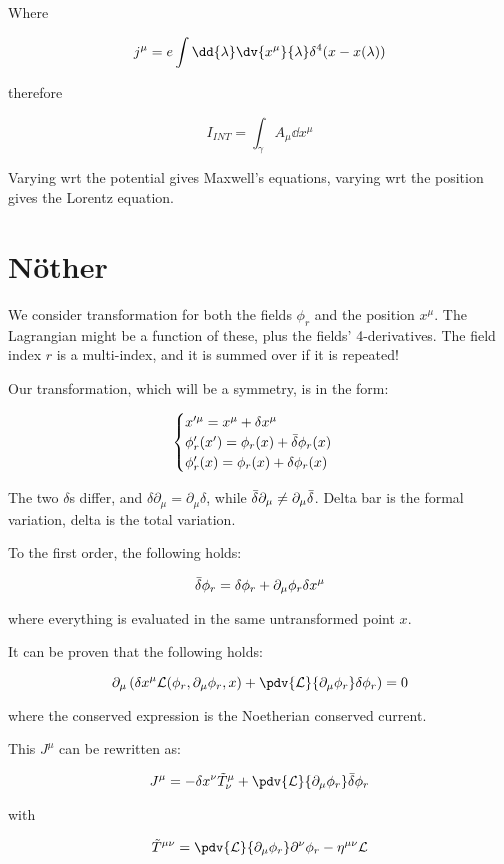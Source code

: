 Where

\[
j^\mu = e \int \dd{\lambda} \dv{x^\mu}{\lambda} \delta^4 (x - x(\lambda)) 
\]

therefore 

\[
I_{INT} = \int _\gamma A_\mu \dd{x^\mu}
\]

Varying wrt the potential gives Maxwell's equations, varying wrt the position gives the Lorentz equation.

\section{Nöther}

We consider transformation for both the fields $\phi_r$ and the position $x^\mu$.
The Lagrangian might be a function of these, plus the fields' 4-derivatives.
The field index $r$ is a multi-index, and it is summed over if it is repeated!

Our transformation, which will be a symmetry, is in the form:

\begin{equation}
    \begin{cases}
    x'^\mu = x^\mu + \delta x^\mu \\
    \phi_r ' (x')  = \phi_r (x) + \Bar{\delta} \phi_r (x) \\
    \phi_r ' (x) = \phi_r (x) + \delta \phi_r (x)
    \end{cases}
\end{equation}

The two $\delta$s differ, and $\delta \partial_\mu = \partial_\mu \delta$, while $\Bar{\delta} \partial_\mu \neq \partial_\mu \Bar{\delta}$. Delta bar is the formal variation, delta is the total variation.

To the first order, the following holds:

\[
\Bar{\delta} \phi_r = \delta \phi_r + \partial_\mu \phi_r \delta x^\mu
\]

where everything is evaluated in the same untransformed point $x$.

It can be proven that the following holds:

\begin{equation}
    \partial_\mu \left(
    \delta x^\mu \mathcal{L} (\phi_r, \partial_\mu \phi_r, x) + \pdv{\mathcal{L}}{\partial_\mu \phi_r} \delta \phi_r 
    \right) = 0
\end{equation}

where the conserved expression is the Noetherian conserved current.

This $J^\mu$ can be rewritten as:

\[
J^\mu = -\delta x^\nu \Tilde{T}_\nu ^\mu + \pdv{\mathcal{L}}{\partial_\mu \phi_r} \Bar{\delta} \phi_r 
\]

with

\[
\Tilde{T} ^{\mu \nu} = \pdv{\mathcal{L}}{\partial_\mu \phi_r} \partial^\nu \phi_r - \eta^{\mu \nu} \mathcal{L} 
\]
